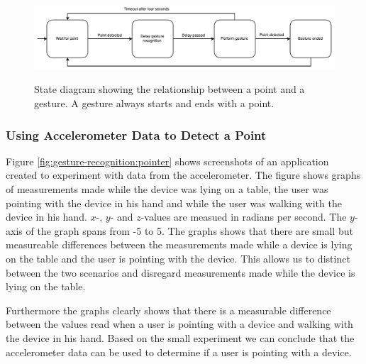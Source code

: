 \begin{figure}[h]
\centering
\includegraphics[width=\textwidth]{images/point-to-gesture-state-diagram}
\label{fig:gesture-recognition:point-to-gesture-state-diagram}
\caption{State diagram showing the relationship between a point and a gesture. A gesture always starts and ends with a point.}
\end{figure}

\subsubsection{Using Accelerometer Data to Detect a Point}

Figure \ref{fig:gesture-recognition:pointer} shows screenshots of an application created to experiment with data from the accelerometer. The figure shows graphs of measurements made while the device was lying on a table, the user was pointing with the device in his hand and while the user was walking with the device in his hand. $x$-, $y$- and $z$-values are measued in radians per second. The $y$-axis of the graph spans from -5 to 5. The graphs shows that there are small but measureable differences between the measurements made while a device is lying on the table and the user is pointing with the device. This allows us to distinct between the two scenarios and disregard measurements made while the device is lying on the table.

Furthermore the graphs clearly shows that there is a measurable difference between the values read when a user is pointing with a device and walking with the device in his hand. Based on the small experiment we can conclude that the accelerometer data can be used to determine if a user is pointing with a device.

